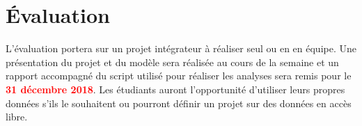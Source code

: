 \documentclass[12]{article}
\begin{document}
	\section*{Évaluation}

  L’évaluation portera sur un projet intégrateur à réaliser seul ou en en
  équipe. Une présentation du projet et du modèle sera réalisée au cours de la
  semaine et un rapport accompagné du script utilisé pour réaliser les analyses
  sera remis pour le \textbf{\textcolor{red}{31 décembre 2018}}. Les étudiants
  auront l’opportunité d’utiliser leurs propres données s’ils le souhaitent ou
  pourront définir un projet sur des données en accès libre.
\end{document}
